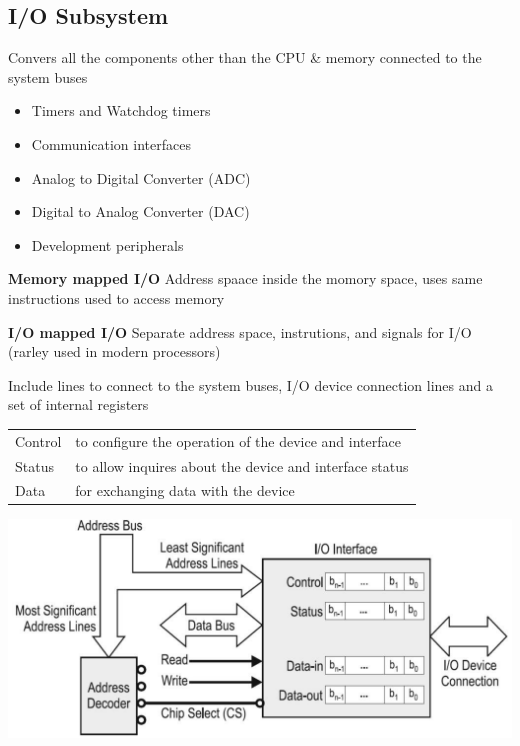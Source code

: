 \subsection{I/O Subsystem}
Convers all the components other than the CPU \& memory connected to the system buses
\begin{itemize}
    \item Timers and Watchdog timers
    \item Communication interfaces
    \item Analog to Digital Converter (ADC)
    \item Digital to Analog Converter (DAC)
    \item Development peripherals
\end{itemize}
\begin{multicols}{2}
    \begin{minipage}{\linewidth}
        \textbf{Memory mapped I/O}\newline
        Address spaace inside the momory space, uses same instructions used to access memory
    \end{minipage}
    
    \begin{minipage}{\linewidth}
        \textbf{I/O mapped I/O} \newline
        Separate address space, instrutions, and signals for I/O (rarley used in modern processors)
    \end{minipage}
\end{multicols}
\hspace{0.5cm}
\begin{multicols}{2}
    \begin{minipage}{\linewidth}
        Include lines to connect to the system buses, I/O device connection lines and a set of internal registers
        \begin{tabular}{ll}
            Control & to configure the operation of the device and interface  \\  
            Status & to allow inquires about the device and interface status  \\ 
            Data & for exchanging data with the device \\ 
        \end{tabular} 
    \end{minipage}
    \includegraphics[width=0.9\linewidth]{images/IOAnatomy}  
\end{multicols}



\clearpage

